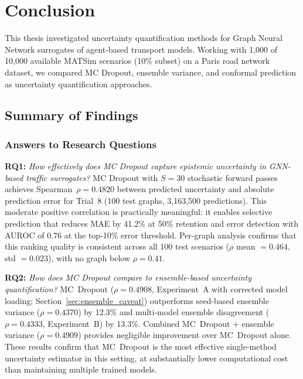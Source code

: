 
\chapter{Conclusion}\label{chapter:conclusion}

This thesis investigated uncertainty quantification methods for Graph Neural Network surrogates of agent-based transport models. Working with 1,000 of 10,000 available MATSim scenarios (10\% subset) on a Paris road network dataset, we compared MC Dropout, ensemble variance, and conformal prediction as uncertainty quantification approaches.

\section{Summary of Findings}

\subsection{Answers to Research Questions}

\textbf{RQ1:} \emph{How effectively does MC Dropout capture epistemic uncertainty in GNN-based traffic surrogates?} MC Dropout with $S = 30$ stochastic forward passes achieves Spearman~$\rho = 0.4820$ between predicted uncertainty and absolute prediction error for Trial~8 (100 test graphs, 3,163,500 predictions). This moderate positive correlation is practically meaningful: it enables selective prediction that reduces MAE by 41.2\% at 50\% retention and error detection with AUROC of 0.76 at the top-10\% error threshold. Per-graph analysis confirms that this ranking quality is consistent across all 100 test scenarios ($\rho$ mean $= 0.464$, std $= 0.023$), with no graph below $\rho = 0.41$.

\textbf{RQ2:} \emph{How does MC Dropout compare to ensemble-based uncertainty quantification?} MC~Dropout ($\rho = 0.4908$, Experiment~A with corrected model loading; Section~\ref{sec:ensemble_caveat}) outperforms seed-based ensemble variance ($\rho = 0.4370$) by 12.3\% and multi-model ensemble disagreement ($\rho = 0.4333$, Experiment~B) by 13.3\%.  Combined MC~Dropout + ensemble variance ($\rho = 0.4909$) provides negligible improvement over MC~Dropout alone.  These results confirm that MC~Dropout is the most effective single-method uncertainty estimator in this setting, at substantially lower computational cost than maintaining multiple trained models.

